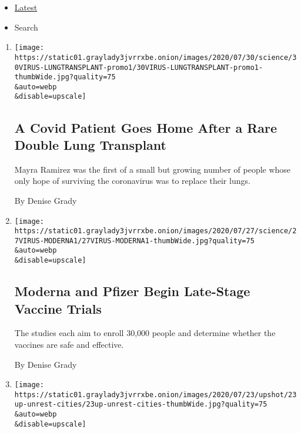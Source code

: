 \begin{itemize}
\tightlist
\item
  \protect\hyperlink{stream-panel}{Latest}
\item
  Search
\end{itemize}

\begin{enumerate}
\def\labelenumi{\arabic{enumi}.}
\item
  \href{/2020/07/30/health/Covid-lung-transplant.html}{}

  \texttt{[image: https://static01.graylady3jvrrxbe.onion/images/2020/07/30/science/30VIRUS-LUNGTRANSPLANT-promo1/30VIRUS-LUNGTRANSPLANT-promo1-thumbWide.jpg?quality=75\\\&auto=webp\\\&disable=upscale]}

  \hypertarget{a-covid-patient-goes-home-after-a-rare-double-lung-transplant}{%
  \subsection{A Covid Patient Goes Home After a Rare Double Lung
  Transplant}\label{a-covid-patient-goes-home-after-a-rare-double-lung-transplant}}

  Mayra Ramirez was the first of a small but growing number of people
  whose only hope of surviving the coronavirus was to replace their
  lungs.

  By Denise Grady
\item
  \href{/2020/07/27/health/moderna-vaccine-covid.html}{}

  \texttt{[image: https://static01.graylady3jvrrxbe.onion/images/2020/07/27/science/27VIRUS-MODERNA1/27VIRUS-MODERNA1-thumbWide.jpg?quality=75\\\&auto=webp\\\&disable=upscale]}

  \hypertarget{moderna-and-pfizer-begin-late-stage-vaccine-trials}{%
  \subsection{Moderna and Pfizer Begin Late-Stage Vaccine
  Trials}\label{moderna-and-pfizer-begin-late-stage-vaccine-trials}}

  The studies each aim to enroll 30,000 people and determine whether the
  vaccines are safe and effective.

  By Denise Grady
\item
  \href{/2020/07/23/upshot/trump-portland.html}{}

  \texttt{[image: https://static01.graylady3jvrrxbe.onion/images/2020/07/23/upshot/23up-unrest-cities/23up-unrest-cities-thumbWide.jpg?quality=75\\\&auto=webp\\\&disable=upscale]}


\end{enumerate}
